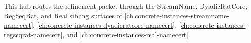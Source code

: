 This hub routes the refinement packet through the StreamName, DyadicRatCore, RegSeqRat, and Real sibling surfaces of \autoref{ch:concrete-instances-streamname-namecert}, \autoref{ch:concrete-instances-dyadicratcore-namecert}, \autoref{ch:concrete-instances-regseqrat-namecert}, and \autoref{ch:concrete-instances-real-namecert}.


